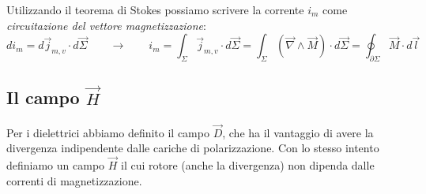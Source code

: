 \documentclass[x11names]{report}
\begin{document}
Utilizzando il teorema di Stokes possiamo scrivere la corrente \(i_m\) come \textit{circuitazione del vettore magnetizzazione}:
\[
di_m = d\vec{j}_{m,v} \cdot d\vec{\Sigma} \qquad \to \qquad i_m = \int_\Sigma \vec{j}_{m,v} \cdot d\vec{\Sigma} = \int_\Sigma \left(\vec{\nabla}\wedge\vec{M}\right) \cdot d\vec{\Sigma} = \oint_{\partial\Sigma} \vec{M}\cdot d\vec{l}
\]

\subsection{Il campo \(\vec{H}\)}
Per i dielettrici abbiamo definito il campo \(\vec{D}\), che ha il vantaggio di avere la divergenza indipendente dalle cariche di polarizzazione. Con lo stesso intento definiamo un campo \(\vec{H}\) il cui rotore (anche la divergenza) non dipenda dalle correnti di magnetizzazione.
\end{document}
